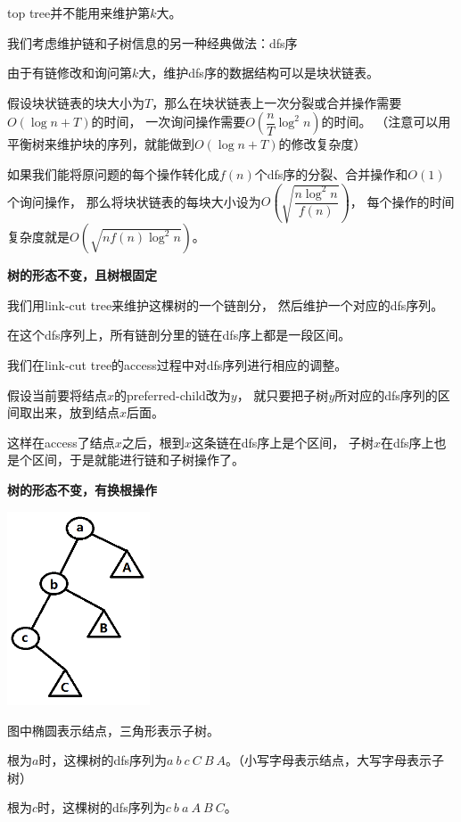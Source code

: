 \documentclass{noithesis}
\begin{document}
top tree并不能用来维护第$k$大。

我们考虑维护链和子树信息的另一种经典做法：dfs序

由于有链修改和询问第$k$大，维护dfs序的数据结构可以是块状链表。

假设块状链表的块大小为$T$，那么在块状链表上一次分裂或合并操作需要$O(\log n + T)$的时间，
一次询问操作需要$O(\dfrac{n}{T} \log ^ 2 n)$的时间。
（注意可以用平衡树来维护块的序列，就能做到$O(\log n +T)$的修改复杂度）

如果我们能将原问题的每个操作转化成$f(n)$个dfs序的分裂、合并操作和$O(1)$个询问操作，
那么将块状链表的每块大小设为$O(\sqrt{\dfrac{n \log ^ 2 n}{f(n)}})$，
每个操作的时间复杂度就是$O(\sqrt{n f(n) \log ^ 2 n})$。

\text{}

\textbf{树的形态不变，且树根固定}

我们用link-cut tree来维护这棵树的一个链剖分，
然后维护一个对应的dfs序列。

在这个dfs序列上，所有链剖分里的链在dfs序上都是一段区间。

我们在link-cut tree的access过程中对dfs序列进行相应的调整。

假设当前要将结点$x$的preferred-child改为$y$，
就只要把子树$y$所对应的dfs序列的区间取出来，放到结点$x$后面。

这样在access了结点$x$之后，根到$x$这条链在dfs序上是个区间，
子树$x$在dfs序上也是个区间，于是就能进行链和子树操作了。

\text{}

\textbf{树的形态不变，有换根操作}

\includegraphics[width=120pt,height=163.1pt]{images/tree-abc.png}

图中椭圆表示结点，三角形表示子树。

根为$a$时，这棵树的dfs序列为$a\ b\ c\ C\ B\ A$。（小写字母表示结点，大写字母表示子树）

根为$c$时，这棵树的dfs序列为$c\ b\ a\ A\ B\ C$。
\end{document}
